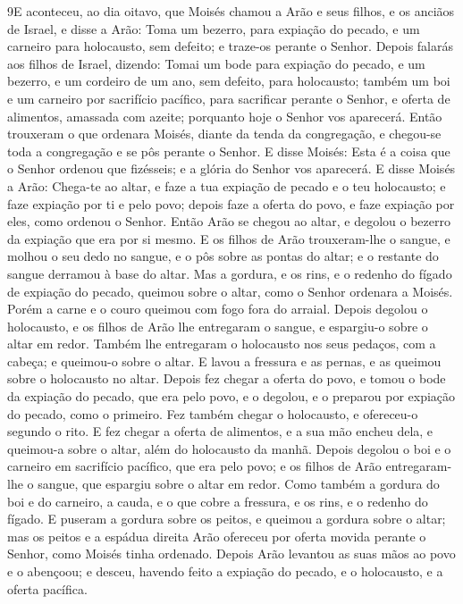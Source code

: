 \lettrine{9} E aconteceu, ao dia oitavo, que Moisés chamou a
Arão e seus filhos, e os anciãos de Israel, e disse a Arão: Toma
um bezerro, para expiação do pecado, e um carneiro para holocausto,
sem defeito; e traze-os perante o Senhor. Depois falarás aos
filhos de Israel, dizendo: Tomai um bode para expiação do pecado, e
um bezerro, e um cordeiro de um ano, sem defeito, para holocausto;
também um boi e um carneiro por sacrifício pacífico, para
sacrificar perante o Senhor, e oferta de alimentos, amassada com
azeite; porquanto hoje o Senhor vos aparecerá. Então trouxeram o
que ordenara Moisés, diante da tenda da congregação, e chegou-se
toda a congregação e se pôs perante o Senhor. E disse Moisés:
Esta é a coisa que o Senhor ordenou que fizésseis; e a glória do
Senhor vos aparecerá. E disse Moisés a Arão: Chega-te ao altar,
e faze a tua expiação de pecado e o teu holocausto; e faze expiação
por ti e pelo povo; depois faze a oferta do povo, e faze expiação
por eles, como ordenou o Senhor. Então Arão se chegou ao altar,
e degolou o bezerro da expiação que era por si mesmo. E os
filhos de Arão trouxeram-lhe o sangue, e molhou o seu dedo no
sangue, e o pôs sobre as pontas do altar; e o restante do sangue
derramou à base do altar. Mas a gordura, e os rins, e o
redenho do fígado de expiação do pecado, queimou sobre o altar, como
o Senhor ordenara a Moisés. Porém a carne e o couro queimou
com fogo fora do arraial. Depois degolou o holocausto, e os
filhos de Arão lhe entregaram o sangue, e espargiu-o sobre o altar
em redor. Também lhe entregaram o holocausto nos seus
pedaços, com a cabeça; e queimou-o sobre o altar. E lavou a
fressura e as pernas, e as queimou sobre o holocausto no altar.
Depois fez chegar a oferta do povo, e tomou o bode da
expiação do pecado, que era pelo povo, e o degolou, e o preparou por
expiação do pecado, como o primeiro. Fez também chegar o
holocausto, e ofereceu-o segundo o rito. E fez chegar a
oferta de alimentos, e a sua mão encheu dela, e queimou-a sobre o
altar, além do holocausto da manhã. Depois degolou o boi e o
carneiro em sacrifício pacífico, que era pelo povo; e os filhos de
Arão entregaram-lhe o sangue, que espargiu sobre o altar em redor.
Como também a gordura do boi e do carneiro, a cauda, e o que
cobre a fressura, e os rins, e o redenho do fígado. E puseram
a gordura sobre os peitos, e queimou a gordura sobre o altar;
mas os peitos e a espádua direita Arão ofereceu por oferta
movida perante o Senhor, como Moisés tinha ordenado. Depois
Arão levantou as suas mãos ao povo e o abençoou; e desceu, havendo
feito a expiação do pecado, e o holocausto, e a oferta pacífica.

